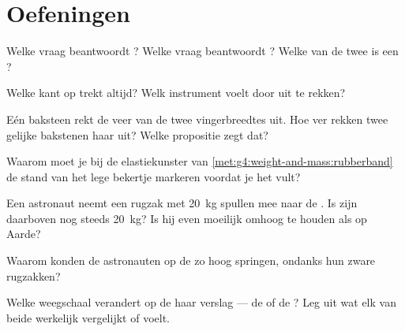 \section{Oefeningen}

\begin{exercise}[$\star$]\label{exo:g4:weight-and-mass:1}
Welke vraag beantwoordt ? Welke vraag beantwoordt
? Welke van de twee is een ?
\end{exercise}

\begin{exercise}[$\star$]\label{exo:g4:weight-and-mass:2}
Welke kant op trekt  altijd? Welk instrument voelt
 door uit te rekken?
\end{exercise}

\begin{exercise}[$\star$]\label{exo:g4:weight-and-mass:3}
Eén baksteen rekt de veer van de  twee vingerbreedtes uit.
Hoe ver rekken twee gelijke bakstenen haar uit? Welke propositie zegt
dat?
\end{exercise}

\begin{exercise}[$\star$]\label{exo:g4:weight-and-mass:4}
Waarom moet je bij de elastiekunster van
\cref{met:g4:weight-and-mass:rubberband} de stand van het lege
bekertje markeren voordat je het vult?
\end{exercise}

\begin{exercise}[$\star$]\label{exo:g4:weight-and-mass:5}
Een astronaut neemt een rugzak met \qty{20}{kg} spullen mee naar de
. Is zijn  daarboven nog steeds \qty{20}{kg}? Is hij even
moeilijk omhoog te houden als op Aarde?
\end{exercise}

\begin{exercise}[$\star$]\label{exo:g4:weight-and-mass:6}
Waarom konden de astronauten op de  zo hoog springen, ondanks hun
zware rugzakken?
\end{exercise}

\begin{exercise}[$\star$]\label{exo:g4:weight-and-mass:7}
Welke weegschaal verandert op de  haar verslag --- de
 of de ? Leg uit wat elk van beide
werkelijk vergelijkt of voelt.
\end{exercise}

